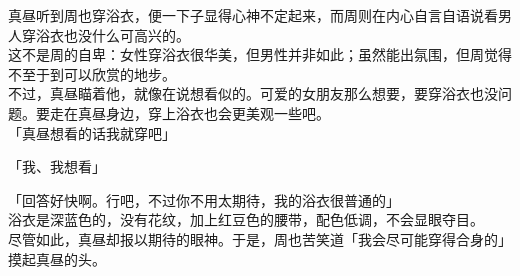 真昼听到周也穿浴衣，便一下子显得心神不定起来，而周则在内心自言自语说看男人穿浴衣也没什么可高兴的。\\

这不是周的自卑：女性穿浴衣很华美，但男性并非如此；虽然能出氛围，但周觉得不至于到可以欣赏的地步。\\

不过，真昼瞄着他，就像在说想看似的。可爱的女朋友那么想要，要穿浴衣也没问题。要走在真昼身边，穿上浴衣也会更美观一些吧。\\

「真昼想看的话我就穿吧」

「我、我想看」

「回答好快啊。行吧，不过你不用太期待，我的浴衣很普通的」\\

浴衣是深蓝色的，没有花纹，加上红豆色的腰带，配色低调，不会显眼夺目。\\

尽管如此，真昼却报以期待的眼神。于是，周也苦笑道「我会尽可能穿得合身的」摸起真昼的头。
